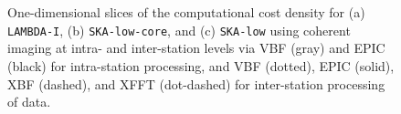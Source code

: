 \documentclass[
  journal=pasa,
  manuscript=article-type,
  year=2020,
  volume=37,
]{cup-journal}
\begin{document}
\begin{figure}
\centering
{} \\
 \\
\caption{One-dimensional slices of the computational cost density for (a) \texttt{LAMBDA-I}, (b) \texttt{SKA-low-core}, and (c) \texttt{SKA-low} using  coherent imaging at intra- and inter-station levels via VBF (gray) and EPIC (black) for intra-station processing, and VBF (dotted), EPIC (solid), XBF (dashed), and XFFT (dot-dashed) for inter-station processing of data. \label{fig:1D-coherent-compcost-a}}
\end{figure}
\end{document}
